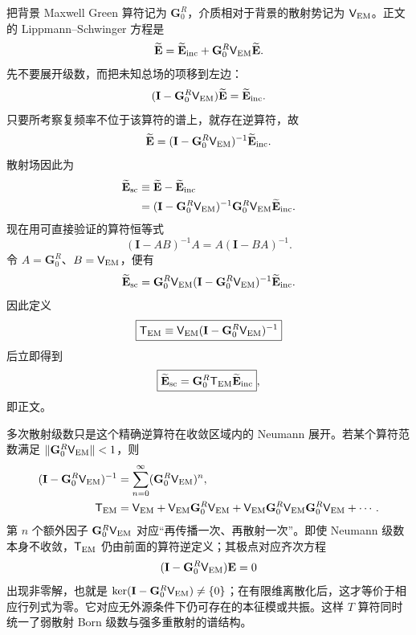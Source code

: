 

\begin{derivation}
把背景 Maxwell Green 算符记为 $\mathbf G_0^R$，介质相对于背景的散射势记为 $\mathsf V_{\rm EM}$。正文的 Lippmann--Schwinger 方程是
\[
\widetilde{\mathbf E}
=\widetilde{\mathbf E}_{\rm inc}
+\mathbf G_0^R\mathsf V_{\rm EM}\widetilde{\mathbf E}.
\]
先不要展开级数，而把未知总场的项移到左边：
\[
(\mathbf I-\mathbf G_0^R\mathsf V_{\rm EM})\widetilde{\mathbf E}
=\widetilde{\mathbf E}_{\rm inc}.
\]
只要所考察复频率不位于该算符的谱上，就存在逆算符，故
\[
\widetilde{\mathbf E}
=(\mathbf I-\mathbf G_0^R\mathsf V_{\rm EM})^{-1}
\widetilde{\mathbf E}_{\rm inc}.
\]
散射场因此为
\begin{align*}
\widetilde{\mathbf E}_{\rm sc}
&\equiv\widetilde{\mathbf E}-\widetilde{\mathbf E}_{\rm inc}\\
&=(\mathbf I-\mathbf G_0^R\mathsf V_{\rm EM})^{-1}
\mathbf G_0^R\mathsf V_{\rm EM}\widetilde{\mathbf E}_{\rm inc}.
\end{align*}
现在用可直接验证的算符恒等式
\[
(\mathbf I-AB)^{-1}A=A(\mathbf I-BA)^{-1}.
\]
令 $A=\mathbf G_0^R$、$B=\mathsf V_{\rm EM}$，便有
\[
\widetilde{\mathbf E}_{\rm sc}
=\mathbf G_0^R
\mathsf V_{\rm EM}
(\mathbf I-\mathbf G_0^R\mathsf V_{\rm EM})^{-1}
\widetilde{\mathbf E}_{\rm inc}.
\]
因此定义
\[
\boxed{
\mathsf T_{\rm EM}
\equiv\mathsf V_{\rm EM}
(\mathbf I-\mathbf G_0^R\mathsf V_{\rm EM})^{-1}}
\]
后立即得到
\[
\boxed{
\widetilde{\mathbf E}_{\rm sc}
=\mathbf G_0^R\mathsf T_{\rm EM}\widetilde{\mathbf E}_{\rm inc}},
\]
即正文。

多次散射级数只是这个精确逆算符在收敛区域内的 Neumann 展开。若某个算符范数满足 $\lVert\mathbf G_0^R\mathsf V_{\rm EM}\rVert<1$，则
\begin{align*}
(\mathbf I-\mathbf G_0^R\mathsf V_{\rm EM})^{-1}
&=\sum_{n=0}^{\infty}(\mathbf G_0^R\mathsf V_{\rm EM})^n,\\
\mathsf T_{\rm EM}
&=\mathsf V_{\rm EM}
+\mathsf V_{\rm EM}\mathbf G_0^R\mathsf V_{\rm EM}
+\mathsf V_{\rm EM}\mathbf G_0^R\mathsf V_{\rm EM}\mathbf G_0^R\mathsf V_{\rm EM}+\cdots.
\end{align*}
第 $n$ 个额外因子 $\mathbf G_0^R\mathsf V_{\rm EM}$ 对应“再传播一次、再散射一次”。即使 Neumann 级数本身不收敛，$\mathsf T_{\rm EM}$ 仍由前面的算符逆定义；其极点对应齐次方程
\[
(\mathbf I-\mathbf G_0^R\mathsf V_{\rm EM})\mathbf E=0
\]
出现非零解，也就是
$\ker(\mathbf I-\mathbf G_0^R\mathsf V_{\rm EM})\neq\{0\}$；在有限维离散化后，这才等价于相应行列式为零。它对应无外源条件下仍可存在的本征模或共振。这样 $T$ 算符同时统一了弱散射 Born 级数与强多重散射的谱结构。
\end{derivation}

